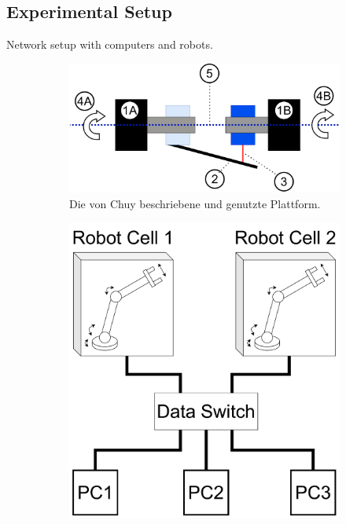 \chapter{}
\label{sec:results}
\section{Experimental Setup}
Network setup with computers and robots.
\begin{figure}[htbp]
	\centering
	   \begin{subfigure}[b]{0.4\textwidth}
	   	\includegraphics[width=1.2\textwidth]{Figures/c6/schematic_messurement_rotation.pdf}
	   	\caption{Die von Chuy beschriebene und genutzte Plattform.}
	   	\label{K2_chuy_robot_P}
	   \end{subfigure}
	   \hspace{2cm}
	   \begin{subfigure}[b]{0.4\textwidth}
	   	\includegraphics[width=1\textwidth]{Figures/c6/network_setup.pdf}

\end{subfigure}
\end{figure}
